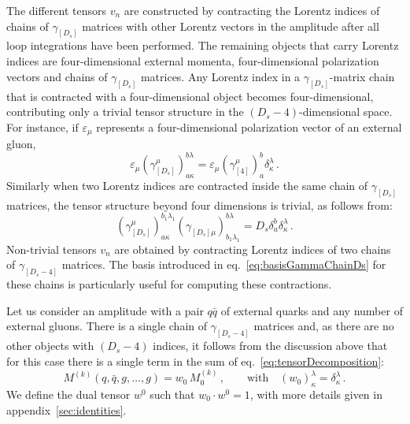 The different tensors $v_n$ are constructed by contracting the
Lorentz indices of chains of $\gamma_{[D_s]}$ matrices with
other Lorentz vectors in the amplitude after all loop
integrations have been performed. The remaining objects that
carry Lorentz indices are four-dimensional external momenta,
four-dimensional polarization vectors and chains of $\gamma_{[D_s]}$
matrices. Any Lorentz index in a $\gamma_{[D_s]}$-matrix 
chain that is contracted with a four-dimensional object becomes
four-dimensional, contributing only a trivial tensor structure 
in the $(D_s-4)$-dimensional space. For instance, if $\varepsilon_\mu$ represents a
four-dimensional polarization vector of an external gluon,
\begin{equation}
	\label{eq:trivialTens1}
	\varepsilon_\mu
	\left(
	\gamma_{[D_s]}^\mu
	\right)_{a\kappa}^{b\lambda}
	=\varepsilon_\mu\left(\gamma_{[4]}^\mu
	\right)_{a}^{b}\delta_{\kappa}^{\lambda}\,.
\end{equation}
Similarly when two Lorentz indices are contracted inside the 
same chain of $\gamma_{[D_s]}$ matrices, the tensor structure
beyond four dimensions is trivial, as follows from:
\begin{equation}
	\label{eq:trivialTens2}
	\left(\gamma_{[D_s]}^\mu\right)_{a \kappa}^{b_1 \lambda_1}
        \left(\gamma_{[D_s]\mu}^{\phantom{\mu}}\right)_{b_1 \lambda_1}^{b \lambda}
	=D_s\delta_{a}^{b}\delta_{\kappa}^{\lambda}\,.
\end{equation}
Non-trivial tensors $v_n$ are obtained by contracting
Lorentz indices of two chains of $\gamma_{[D_s-4]}$ matrices.
The basis introduced in eq.~\eqref{eq:basisGammaChainDs} 
for these chains is particularly useful for
computing these contractions.

Let us consider an amplitude with a pair $q\bar q$ of external
quarks and any number of external gluons. There is a single
chain of $\gamma_{[D_s-4]}$ matrices and,
as there are no other objects with $(D_s-4)$ indices, it
follows from the discussion above that
for this case there is a single term in the sum of
eq.~\eqref{eq:tensorDecomposition}:
\begin{equation}\label{eq:decompqqbar}
	M^{(k)}
	(q,\bar q,g,\ldots,g)
	=w_0\,M^{(k)}_0\,,\qquad
	\textrm{with}\quad
	(w_0)_{\kappa}^{\lambda}=\delta_{\kappa}^{\lambda}\,.
\end{equation}
We define the dual tensor
$w^0$ such that $w_0\cdot w^0=1$, with more details given in
appendix~\ref{sec:identities}.

